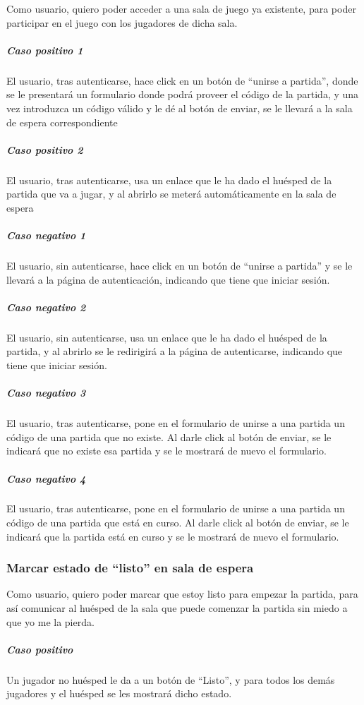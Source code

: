 Como usuario, quiero poder acceder a una sala de juego ya existente, para poder participar en el juego con los jugadores de dicha sala. 

\subparagraph{Caso positivo 1}

El usuario, tras autenticarse, hace click en un botón de “unirse a partida”, donde se le presentará un formulario donde podrá proveer el código de la partida, y una vez introduzca un código válido y le dé al botón de enviar, se le llevará a la sala de espera correspondiente 

\subparagraph{Caso positivo 2}

El usuario, tras autenticarse, usa un enlace que le ha dado el huésped de la partida que va a jugar, y al abrirlo se meterá automáticamente en la sala de espera 

\subparagraph{Caso negativo 1}

El usuario, sin autenticarse, hace click en un botón de “unirse a partida” y se le llevará a la página de autenticación, indicando que tiene que iniciar sesión. 

\subparagraph{Caso negativo 2}
El usuario, sin autenticarse, usa un enlace que le ha dado el huésped de la partida, y al abrirlo se le redirigirá a la página de autenticarse, indicando que tiene que iniciar sesión. 

\subparagraph{Caso negativo 3}
El usuario, tras autenticarse, pone en el formulario de unirse a una partida un código de una partida que no existe. Al darle click al botón de enviar, se le indicará que no existe esa partida y se le mostrará de nuevo el formulario. 

\subparagraph{Caso negativo 4}
El usuario, tras autenticarse, pone en el formulario de unirse a una partida un código de una partida que está en curso. Al darle click al botón de enviar, se le indicará que la partida está en curso y se le mostrará de nuevo el formulario. 

\subsubsection{Marcar estado de “listo” en sala de espera}

Como usuario, quiero poder marcar que estoy listo para empezar la partida, para así comunicar al huésped de la sala que puede comenzar la partida sin miedo a que yo me la pierda. 

\subparagraph{Caso positivo}

Un jugador no huésped le da a un botón de “Listo”, y para todos los demás jugadores y el huésped se les mostrará dicho estado. 

